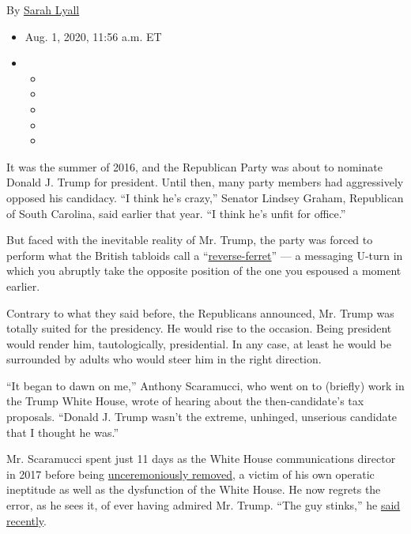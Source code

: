 By \href{https://www.nytimes3xbfgragh.onion/by/sarah-lyall}{Sarah Lyall}

\begin{itemize}
\item
  Aug. 1, 2020, 11:56 a.m. ET
\item
  \begin{itemize}
  \item
  \item
  \item
  \item
  \item
  \end{itemize}
\end{itemize}

It was the summer of 2016, and the Republican Party was about to
nominate Donald J. Trump for president. Until then, many party members
had aggressively opposed his candidacy. ``I think he's crazy,'' Senator
Lindsey Graham, Republican of South Carolina, said earlier that year.
``I think he's unfit for office.''

But faced with the inevitable reality of Mr. Trump, the party was forced
to perform what the British tabloids call a
``\href{https://www.forbes.com/sites/andrewbusby/2019/03/29/the-reverse-ferret-and-the-department-store-how-today-became-debs-day/\#6eebddc017de}{reverse-ferret}''
--- a messaging U-turn in which you abruptly take the opposite position
of the one you espoused a moment earlier.

Contrary to what they said before, the Republicans announced, Mr. Trump
was totally suited for the presidency. He would rise to the occasion.
Being president would render him, tautologically, presidential. In any
case, at least he would be surrounded by adults who would steer him in
the right direction.

``It began to dawn on me,'' Anthony Scaramucci, who went on to (briefly)
work in the Trump White House, wrote of hearing about the
then-candidate's tax proposals. ``Donald J. Trump wasn't the extreme,
unhinged, unserious candidate that I thought he was.''

Mr. Scaramucci spent just 11 days as the White House communications
director in 2017 before being
\href{https://www.nytimes3xbfgragh.onion/2017/07/31/us/politics/trump-white-house-obamacare-health.html}{unceremoniously
removed}, a victim of his own operatic ineptitude as well as the
dysfunction of the White House. He now regrets the error, as he sees it,
of ever having admired Mr. Trump. ``The guy stinks,'' he
\href{https://www.theguardian.com/tv-and-radio/2020/jul/17/the-guy-stinks-and-hes-a-racist-anthony-scaramucci-on-donald-trump}{said
recently}.

